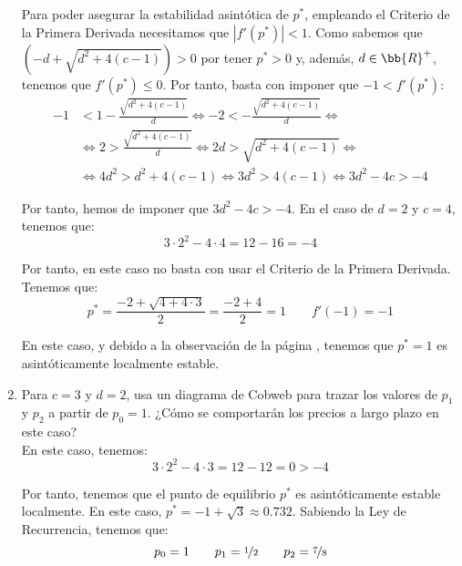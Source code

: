 \begin{ejercicio}
\begin{enumerate}
        Para poder asegurar la estabilidad asintótica de $p^\ast$, empleando el Criterio de la Primera Derivada necesitamos que $|f'(p^\ast)|<1$. Como sabemos que $\left(-d + \sqrt{d^2+4(c-1)}\right)>0$ por tener $p^\ast>0$ y, además, $d\in \bb{R}^+$, tenemos que $f'(p^\ast)\leq 0$. Por tanto, basta con imponer que $-1<f'(p^\ast)$:
        \begin{align*}
            -1 &< 1-\frac{\sqrt{d^2+4(c-1)}}{d}
            \Longleftrightarrow
            -2 < -\frac{\sqrt{d^2+4(c-1)}}{d}
            \Longleftrightarrow \\ &\Longleftrightarrow
            2 > \frac{\sqrt{d^2+4(c-1)}}{d} \Longleftrightarrow
            2d > \sqrt{d^2+4(c-1)}
            \Longleftrightarrow \\ &\Longleftrightarrow
            4d^2 > d^2+4(c-1) \Longleftrightarrow
            3d^2 > 4(c-1) \Longleftrightarrow
            3d^2-4c>-4
        \end{align*}

        Por tanto, hemos de imponer que $3d^2-4c>-4$. En el caso de $d=2$ y $c=4$, tenemos que:
        \begin{equation*}
            3\cdot 2^2 - 4\cdot 4 = 12-16 = -4
        \end{equation*}

        Por tanto, en este caso no basta con usar el Criterio de la Primera Derivada. Tenemos que:
        \begin{equation*}
            p^\ast = \frac{-2+ \sqrt{4+4\cdot 3}}{2} = \frac{-2+4}{2} = 1 \qquad f'(-1)=-1
        \end{equation*}

        En este caso, y debido a la observación de la página \pageref{obs:polinomio2grado}, tenemos que $p^\ast=1$ es asintóticamente localmente estable.
        
        \item Para $c = 3$ y $d = 2$, usa un diagrama de Cobweb para trazar los valores de $p_1$ y $p_2$ a partir de $p_0 = 1$. ¿Cómo se comportarán los precios a largo plazo en este caso?\\

        En este caso, tenemos:
        \begin{equation*}
            3\cdot 2^2 - 4\cdot 3 = 12-12 = 0 > -4
        \end{equation*}

        Por tanto, tenemos que el punto de equilibrio $p^\ast$ es asintóticamente estable localmente. En este caso, $p^\ast = -1+\sqrt{3}\approx 0.732$. Sabiendo la Ley de Recurrencia, tenemos que:
        \begin{equation*}
            p_0 = 1 \qquad p_1 = \nicefrac{1}{2} \qquad p_2 = \nicefrac{7}{8}
        \end{equation*}        
        

\end{enumerate}
\end{ejercicio}
